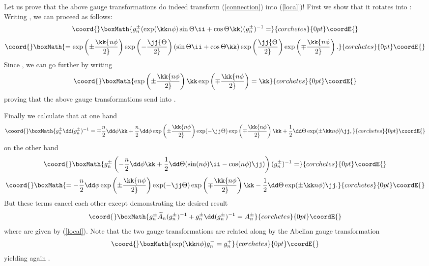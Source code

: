 \documentclass[a4paper,12pt,draft]{article}
\begin{document}
Let us prove that the above gauge transformations do indeed transform
(\ref{connection}) into (\ref{local})!
First we show that it rotates \coordHE{} into \myHighlight{$\kk$}\coordHE{}: 
Writing  \coordHE{}, we can
proceed as follows:
\[\coord{}\boxMath{g^\pm_n(\exp (\kk n\phi )\sin\Theta\ii +\cos\Theta\kk )(g_n^\pm)^{-1} 
=}{corchetes}{0pt}\coordE{}\]
\[\coord{}\boxMath{=\exp\left(\pm\kk{n\phi\over 2}\right)\exp\left(-\jj{\Theta\over
2}\right)(\sin\Theta\ii +\cos\Theta\kk )\exp\left(\jj{\Theta\over
2}\right)\exp\left(\mp\kk{n\phi\over 2}\right) .}{corchetes}{0pt}\coordE{}\]
Since \myHighlight{$\sin\Theta\ii +\cos\Theta\kk =\exp (\jj\Theta )\kk$}\coordHE{}, we can go
further by writing
\[\coord{}\boxMath{\exp\left(\pm\kk{n\phi\over 2}\right)\kk\exp\left(\mp\kk{n\phi\over
2}\right)=\kk}{corchetes}{0pt}\coordE{}\] 
proving that the above gauge transformations \coordHE{}
send \coordHE{} into \myHighlight{$\kk$}\coordHE{}.

Finally we calculate that at one hand 
\[\coord{}\boxMath{g^\pm_n\dd (g^\pm_n)^{-1} = \mp{n\over 2}\dd\phi\kk +{n\over 2}\dd\phi
\exp\left(\pm\kk{n\phi\over 2}\right)\exp (-\jj\Theta
)\exp\left(\mp\kk{n\phi\over 2}\right)\kk +{1\over 2}\dd\Theta\exp
(\pm\kk n\phi )\jj ,}{corchetes}{0pt}\coordE{}\]
on the other hand
\[\coord{}\boxMath{g_n^\pm\left( -{n\over 2}\dd\phi\kk
+{1\over 2}\dd\Theta (\sin (n\phi )\ii -\cos (n\phi )\jj
)\right)(g^\pm_n)^{-1} =}{corchetes}{0pt}\coordE{}\]
\[\coord{}\boxMath{= -{n\over 2}\dd\phi\exp\left(\pm\kk{n\phi\over
2}\right)\exp (-\jj\Theta )\exp\left(\mp\kk{n\phi\over 2}\right)\kk
-{1\over 2}\dd\Theta\exp (\pm\kk n\phi )\jj .}{corchetes}{0pt}\coordE{}\] 
But these terms cancel each other except \coordHE{} demonstrating the desired result
\[\coord{}\boxMath{g^\pm_n\widetilde{A}_n(g^\pm_n)^{-1} +g^\pm_n\dd (g^\pm_n)^{-1} =
A^\pm_n}{corchetes}{0pt}\coordE{}\]
where \coordHE{} are given by (\ref{local}). Note that the two gauge
transformations are related along \coordHE{} by the Abelian
gauge transformation
\[\coord{}\boxMath{\exp (\kk n\phi ) g^-_n=g^+_n }{corchetes}{0pt}\coordE{}\]
yielding again \coordHE{}.
\end{document}
